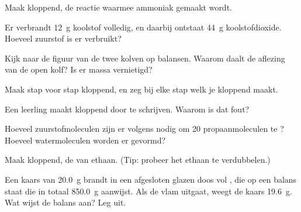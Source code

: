 \begin{exercise}[$\star\star$]\label{exo:g8:balanced-equations:5}
Maak  kloppend, de reactie waarmee ammoniak gemaakt wordt. %
\end{exercise}

\begin{exercise}[$\star\star$]\label{exo:g8:balanced-equations:6}
Er verbrandt \qty{12}{g} koolstof volledig, en daarbij ontstaat
\qty{44}{g} koolstofdioxide. Hoeveel zuurstof is er verbruikt?
\end{exercise}

\begin{exercise}[$\star\star$]\label{exo:g8:balanced-equations:7}
Kijk naar de figuur van de twee kolven op balansen. Waarom daalt de
aflezing van de open kolf? Is er massa vernietigd?
\end{exercise}

\begin{exercise}[$\star\star$]\label{exo:g8:balanced-equations:8}
Maak  stap voor stap kloppend, en zeg bij %
elke stap welk  je kloppend maakt.
\end{exercise}

\begin{exercise}[$\star\star$]\label{exo:g8:balanced-equations:9}
Een leerling maakt  kloppend door  te schrijven. %
Waarom is dat fout?
\end{exercise}

\begin{exercise}[$\star\star$]\label{exo:g8:balanced-equations:10}
Hoeveel zuurstofmoleculen zijn er volgens 
nodig om 20 propaanmoleculen te ? Hoeveel watermoleculen
worden er gevormd?
\end{exercise}

\begin{exercise}[$\star\star\star$]\label{exo:g8:balanced-equations:11}
Maak  kloppend, de  van ethaan. %
(Tip: probeer het ethaan te verdubbelen.)
\end{exercise}

\begin{exercise}[$\star\star\star$]\label{exo:g8:balanced-equations:12}
Een kaars van \qty{20.0}{g} brandt in een afgesloten glazen doos vol
, die op een balans staat die in totaal \qty{850.0}{g} aanwijst.
Als de vlam uitgaat, weegt de kaars \qty{19.6}{g}. Wat wijst de balans
aan? Leg uit.
\end{exercise}

